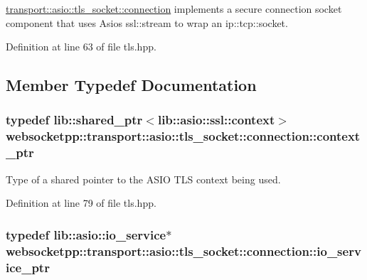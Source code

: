 \hyperlink{classwebsocketpp_1_1transport_1_1asio_1_1tls__socket_1_1connection}{transport\+::asio\+::tls\+\_\+socket\+::connection} implements a secure connection socket component that uses Asio\textquotesingle{}s ssl\+::stream to wrap an ip\+::tcp\+::socket. 

Definition at line 63 of file tls.\+hpp.



\subsection{Member Typedef Documentation}
\hypertarget{classwebsocketpp_1_1transport_1_1asio_1_1tls__socket_1_1connection_a268bd7f4a04d78004247d6d8d769b841}{}
\subsubsection[{context\+\_\+ptr}]{\setlength{\rightskip}{0pt plus 5cm}typedef lib\+::shared\+\_\+ptr$<$lib\+::asio\+::ssl\+::context$>$ {\bf websocketpp\+::transport\+::asio\+::tls\+\_\+socket\+::connection\+::context\+\_\+ptr}}\label{classwebsocketpp_1_1transport_1_1asio_1_1tls__socket_1_1connection_a268bd7f4a04d78004247d6d8d769b841}


Type of a shared pointer to the A\+S\+I\+O T\+L\+S context being used. 



Definition at line 79 of file tls.\+hpp.

\hypertarget{classwebsocketpp_1_1transport_1_1asio_1_1tls__socket_1_1connection_af821cbbeb6df7cdea6348c7d64b00b7a}{}
\subsubsection[{io\+\_\+service\+\_\+ptr}]{\setlength{\rightskip}{0pt plus 5cm}typedef lib\+::asio\+::io\+\_\+service$\ast$ {\bf websocketpp\+::transport\+::asio\+::tls\+\_\+socket\+::connection\+::io\+\_\+service\+\_\+ptr}}\label{classwebsocketpp_1_1transport_1_1asio_1_1tls__socket_1_1connection_af821cbbeb6df7cdea6348c7d64b00b7a}


